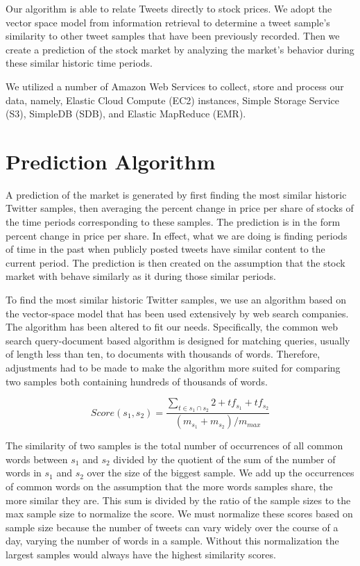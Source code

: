 \documentclass[twocolumn]{article}
\begin{document}
Our algorithm is able to relate Tweets directly to stock prices. We adopt the vector space model from information retrieval to determine a tweet sample’s similarity to other tweet samples that have been previously recorded. Then we create a prediction of the stock market by analyzing the market’s behavior during these similar historic time periods.

We utilized a number of Amazon Web Services to collect, store and process our data, namely, Elastic Cloud Compute (EC2) instances, Simple Storage Service (S3), SimpleDB (SDB), and Elastic MapReduce (EMR).

\section{Prediction Algorithm}
A prediction of the market is generated by first finding the most similar historic Twitter samples, then averaging the percent change in price per share of stocks of the time periods corresponding to these samples. The prediction is in the form percent change in price per share. In effect, what we are doing is finding periods of time in the past when publicly posted tweets have similar content to the current period. The prediction is then created on the assumption that the stock market with behave similarly as it during those similar periods.

To find the most similar historic Twitter samples, we use an algorithm based on the vector-space model that has been used extensively by web search companies. The algorithm has been altered to fit our needs. Specifically, the common web search query-document based algorithm is designed for matching queries, usually of length less than ten, to documents with thousands of words. Therefore, adjustments had to be made to make the algorithm more suited for comparing two samples both containing hundreds of thousands of words.

$$ Score(s_1, s_2) = \frac{\sum_{t \in s_1 \cap s_2} 2+tf_{s_1}+tf_{s_2}}{(m_{s_1}+m_{s_2}) / m_{max}} $$ 	

The similarity of two samples is the total number of occurrences of all common words between $s_1$ and $s_2$ divided by the quotient of the sum of the number of words in $s_1$ and $s_2$ over the size of the biggest sample. We add up the occurrences of common words on the assumption that the more words samples share, the more similar they are. This sum is divided by the ratio of the sample sizes to the max sample size to normalize the score. We must normalize these scores based on sample size because the number of tweets can vary widely over the course of a day, varying the number of words in a sample. Without this normalization the largest samples would always have the highest similarity scores.
\end{document}
